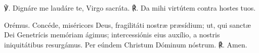 ℣. Dignáre me laudáre te, Virgo sacráta.
℟. Da mihi virtútem contra hostes tuos.

Orémus. 
Concéde, miséricors Deus, fragilitáti nostræ præsídium; ut, qui sanctæ Dei Genetrícis memóriam ágimus; intercessiónis eius auxílio, a nostris iniquitátibus resurgámus. Per eúndem Christum Dóminum nóstrum.  ℟. Amen.